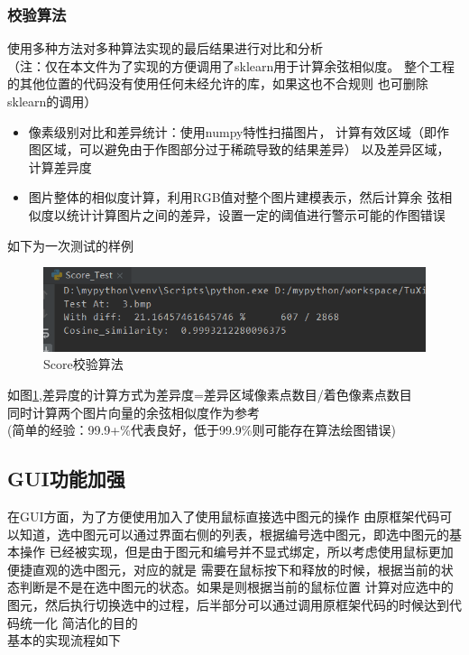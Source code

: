 \documentclass[a4paper,UTF8]{article}
\theoremstyle{definition}
\begin{document}
\subsubsection{校验算法}
使用多种方法对多种算法实现的最后结果进行对比和分析\\
（注：仅在本文件为了实现的方便调用了sklearn用于计算余弦相似度。
整个工程的其他位置的代码没有使用任何未经允许的库，如果这也不合规则
也可删除sklearn的调用）
\begin{itemize}
    \item 像素级别对比和差异统计：使用numpy特性扫描图片，
    计算有效区域（即作图区域，可以避免由于作图部分过于稀疏导致的结果差异）
    以及差异区域，计算差异度
    \item 图片整体的相似度计算，利用RGB值对整个图片建模表示，然后计算余
    弦相似度以统计计算图片之间的差异，设置一定的阈值进行警示可能的作图错误
\end{itemize}
如下为一次测试的样例\\

\begin{figure}[h]
	\centering
	\includegraphics[scale=0.6]{figure/test.png}
	\caption{Score校验算法}
	\label{fig:Score}
\end{figure}
如图\ref{fig:Score},差异度的计算方式为差异度=差异区域像素点数目/着色像素点数目\\
同时计算两个图片向量的余弦相似度作为参考\\
(简单的经验：99.9+\%代表良好，低于99.9\%则可能存在算法绘图错误)\\
\subsection{GUI功能加强}
在GUI方面，为了方便使用加入了使用鼠标直接选中图元的操作
由原框架代码可以知道，选中图元可以通过界面右侧的列表，根据编号选中图元，即选中图元的基本操作
已经被实现，但是由于图元和编号并不显式绑定，所以考虑使用鼠标更加便捷直观的选中图元，对应的就是
需要在鼠标按下和释放的时候，根据当前的状态判断是不是在选中图元的状态。如果是则根据当前的鼠标位置
计算对应选中的图元，然后执行切换选中的过程，后半部分可以通过调用原框架代码的时候达到代码统一化
简洁化的目的\\
基本的实现流程如下
\end{document}
